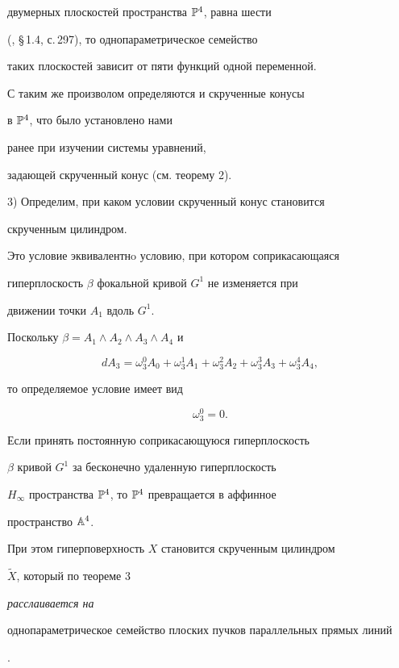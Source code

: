 двумерных плоскостей пространства  ${\Bbb P}^4$, равна шести


(\cite{AG93}, \S\,1.4, с.\,297), то однопараметрическое семейство


таких плоскостей зависит от пяти функций одной переменной.


С таким же произволом определяются и скрученные конусы


в ${\Bbb P}^4$, что было установлено нами


ранее при изучении системы уравнений,


задающей скрученный конус (см. теорему 2).





3) Определим, при каком условии скрученный конус становится


скрученным цилиндром.


Это условие эквивалентнo условию, при котором соприкасающаяся


гиперплоскость $\beta$ фокальной кривой $G^1$ не изменяется при


движении точки $A_1$ вдоль $G^1$.


Поскольку $\beta = A_1 \wedge A_2 \wedge A_3 \wedge A_4$ и


$$


d A_3 =  \omega_3^0 A_0 +  \omega_3^1 A_1 + \omega_3^2 A_2


+  \omega_3^3 A_3 + \omega_3^4 A_4,


$$


то определяемое условие имеет вид


\begin{equation}\label{eq:54}


\omega_3^0 = 0.


\end{equation}


Если принять постоянную соприкасающуюся гиперплоскость


$\beta$ кривой $G^1$ за бесконечно удаленную гиперплоскость


$H_\infty$ пространства ${\Bbb P}^4$, то ${\Bbb P}^4$ превращается в аффинное


пространство ${\Bbb A}^4$.


При этом гиперповерхность $X$ становится скрученным цилиндром


$\widetilde{X}$, который по теореме 3 {\em расслаивается на


однопараметрическое семейство плоских пучков параллельных прямых линий}.


